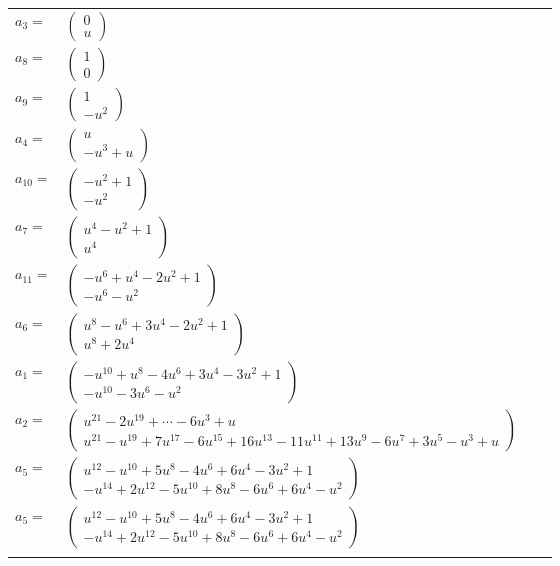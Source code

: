 \documentclass[1p]{elsarticle_modified}
\theoremstyle{definition}
\begin{document}
\begin{tabular}{m{7pt} m{180pt} m{7pt} m{180pt} }
\flushright $a_{3}=$&$\begin{pmatrix}0\\u\end{pmatrix}$ \\
\flushright $a_{8}=$&$\begin{pmatrix}1\\0\end{pmatrix}$ \\
\flushright $a_{9}=$&$\begin{pmatrix}1\\- u^2\end{pmatrix}$ \\
\flushright $a_{4}=$&$\begin{pmatrix}u\\- u^3+u\end{pmatrix}$ \\
\flushright $a_{10}=$&$\begin{pmatrix}- u^2+1\\- u^2\end{pmatrix}$ \\
\flushright $a_{7}=$&$\begin{pmatrix}u^4- u^2+1\\u^4\end{pmatrix}$ \\
\flushright $a_{11}=$&$\begin{pmatrix}- u^6+u^4-2 u^2+1\\- u^6- u^2\end{pmatrix}$ \\
\flushright $a_{6}=$&$\begin{pmatrix}u^8- u^6+3 u^4-2 u^2+1\\u^8+2 u^4\end{pmatrix}$ \\
\flushright $a_{1}=$&$\begin{pmatrix}- u^{10}+u^8-4 u^6+3 u^4-3 u^2+1\\- u^{10}-3 u^6- u^2\end{pmatrix}$ \\
\flushright $a_{2}=$&$\begin{pmatrix}u^{21}-2 u^{19}+\cdots-6 u^3+u\\u^{21}- u^{19}+7 u^{17}-6 u^{15}+16 u^{13}-11 u^{11}+13 u^9-6 u^7+3 u^5- u^3+u\end{pmatrix}$ \\
\flushright $a_{5}=$&$\begin{pmatrix}u^{12}- u^{10}+5 u^8-4 u^6+6 u^4-3 u^2+1\\- u^{14}+2 u^{12}-5 u^{10}+8 u^8-6 u^6+6 u^4- u^2\end{pmatrix}$\\ \flushright $a_{5}=$&$\begin{pmatrix}u^{12}- u^{10}+5 u^8-4 u^6+6 u^4-3 u^2+1\\- u^{14}+2 u^{12}-5 u^{10}+8 u^8-6 u^6+6 u^4- u^2\end{pmatrix}$\\&\end{tabular}
\end{document}
